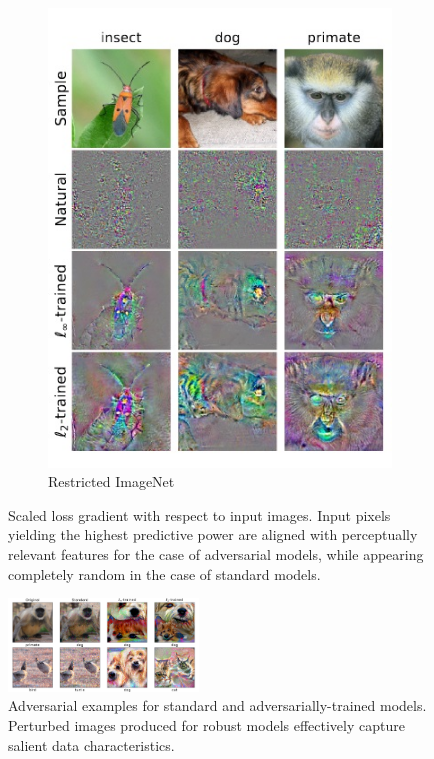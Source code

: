 \begin{figure}[H]
\begin{subfigure}[b]{0.28\textwidth}
        \includegraphics[width=\textwidth]{img/introduction/adversarial_loss_2.jpg}
        \caption{Restricted ImageNet}
    \end{subfigure}
       \caption{Scaled loss gradient with respect to input images.
       Input pixels yielding the highest predictive power are aligned 
       with perceptually relevant features for the case of adversarial
       models, while appearing completely random in the case of 
       standard models.
       \cite{tsiprasRobustnessMayBe2019}}
       \label{fig:adversarial_loss}
\end{figure}


\begin{figure}[H]
    \centering
    \includegraphics[width=0.45\textwidth]{img/introduction/adversarial_salient.png}
    \caption{Adversarial examples for standard and adversarially-trained models.
    Perturbed images produced for robust models 
    effectively capture salient data characteristics.
    \cite{tsiprasRobustnessMayBe2019}}
    \label{fig:salient_characteristics}
\end{figure}

